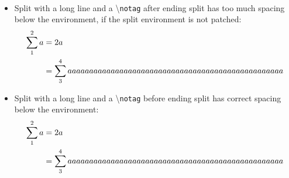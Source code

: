 \documentclass{article}
\begin{document}
\begin{itemize}
{\begin{align}
					\label{problematicLabel}
				\end{align}
			}
		\item Split with a long line and a \textbackslash\texttt{notag} after ending split has too much spacing below the environment, if the split environment is not patched:
			\begin{equation}
				\begin{split}
					\sum_1^2 a &= 2a\\
							&= \sum_3^4 aaaaaaaaaaaaaaaaaaaaaaaaaaaaaaaaaaaaaaaaaaaaaaaaaa
				\end{split}\notag
			\end{equation}
		\item Split with a long line and a \textbackslash\texttt{notag} before ending split has correct spacing below the environment:
			\begin{equation}
				\begin{split}
					\sum_1^2 a &= 2a\\
							&= \sum_3^4 aaaaaaaaaaaaaaaaaaaaaaaaaaaaaaaaaaaaaaaaaaaaaaaaaa\notag
				\end{split}

\end{equation}
\end{itemize}
\end{document}
